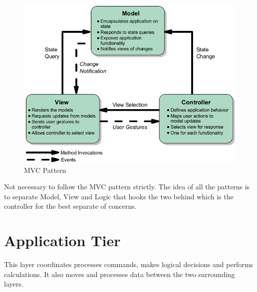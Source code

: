     \begin{figure}[!ht]
     \centering
     \includegraphics[scale=0.5]{images/MVCPattern.png}   
     \caption[MVC Pattern]{MVC Pattern}
     \label{img:MVCPattern}                           
     \end{figure}
  
  Not necessary to follow the MVC pattern strictly. The idea of all the patterns is to separate Model, View and Logic that hooks the two behind which is the controller for the best separate of concerns.

\section{Application Tier}
  This layer coordinates processes commands, makes logical decisions and performs calculations. It also moves and processes data between the two surrounding layers.


